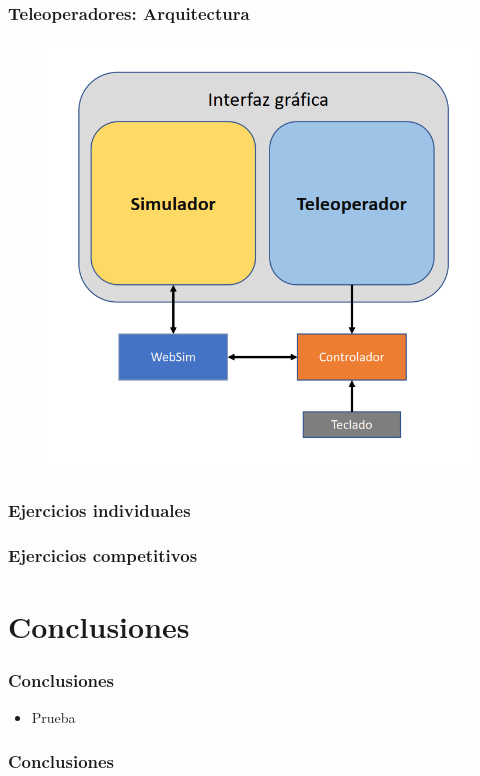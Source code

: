 \documentclass[xcolor={table}]{beamer}
\begin{document}
		
		\begin{frame}
			\frametitle{Teleoperadores: Arquitectura}
			\begin{figure}
			    \centering			    \includegraphics[scale=0.45]{img/arquitecturaTeleoperador.png}
			    \label{fig:teleop}
			\end{figure}
			
		\end{frame}

		\begin{frame}
			\frametitle{Ejercicios individuales}
		\end{frame}
		
		\begin{frame}
			\frametitle{Ejercicios competitivos}
		\end{frame}

	\section{Conclusiones}
		\begin{frame}
			\frametitle{Conclusiones}
			\begin{itemize}
				\item Prueba
			\end{itemize}
		\end{frame}
	
	\appendix

	\backupbegin
	  \begin{frame}
	    \frametitle{Conclusiones}
	  \end{frame}
	\backupend
\end{document}
